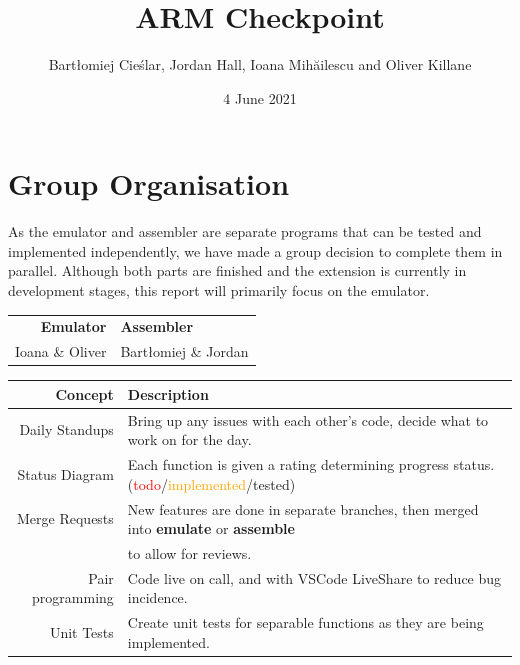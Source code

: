 \documentclass[11pt]{article}
\begin{document}
\title{ARM Checkpoint}
\author{Bartłomiej Cieślar, Jordan Hall, Ioana Mihăilescu and Oliver Killane}
\date{4 June 2021}

\maketitle

\section{Group Organisation}
    As the emulator and assembler are separate programs that can be tested and implemented independently, we have made a group decision to complete them in parallel. Although both parts are finished and the extension is currently in development stages, this report will primarily focus on the emulator.
    \begin{center}
        \begin{tabular}{ r | l }
            \textbf{Emulator} & \textbf{Assembler} \\
            Ioana \& Oliver & Bartłomiej \& Jordan \\
        \end{tabular}
    \end{center}
    \begin{center}
        \begin{tabular}{r | l}
        \textbf{Concept} & \textbf{Description} \\
            \hline 
            
            Daily Standups & Bring up any issues with each other's code, decide what to work on for the day. \\
            Status Diagram & Each function is given a rating determining progress status. (\textcolor{red}{todo}/\textcolor{orange}{implemented}/\textcolor{OliveGreen}{tested}) \\
            Merge Requests & New features are done in separate branches, then merged into \textbf{emulate} or \textbf{assemble}\\&to allow for reviews. \\
            Pair programming & Code live on call, and with VSCode LiveShare to reduce bug incidence. \\
            Unit Tests & Create unit tests for separable functions as they are being implemented. \\
        \end{tabular}
    \end{center}
\end{document}
